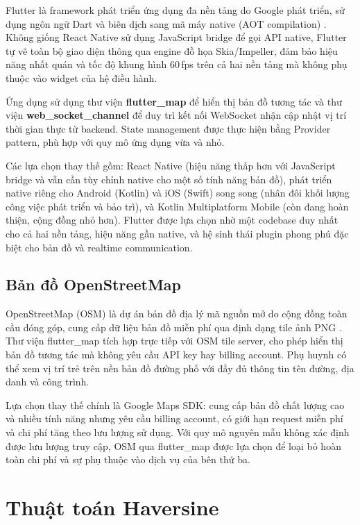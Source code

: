 \documentclass[../DoAn.tex]{subfiles}
\begin{document}
Flutter là framework phát triển ứng dụng đa nền tảng do Google phát triển, sử dụng ngôn ngữ Dart và biên dịch sang mã máy native (AOT compilation) \cite{flutter_docs}. Không giống React Native sử dụng JavaScript bridge để gọi API native, Flutter tự vẽ toàn bộ giao diện thông qua engine đồ họa Skia/Impeller, đảm bảo hiệu năng nhất quán và tốc độ khung hình 60\,fps trên cả hai nền tảng mà không phụ thuộc vào widget của hệ điều hành.

Ứng dụng sử dụng thư viện \textbf{flutter\_map} \cite{flutter_map_pkg} để hiển thị bản đồ tương tác và thư viện \textbf{web\_socket\_channel} để duy trì kết nối WebSocket nhận cập nhật vị trí thời gian thực từ backend. State management được thực hiện bằng Provider pattern, phù hợp với quy mô ứng dụng vừa và nhỏ.

Các lựa chọn thay thế gồm: React Native (hiệu năng thấp hơn với JavaScript bridge và vẫn cần tùy chỉnh native cho một số tính năng bản đồ), phát triển native riêng cho Android (Kotlin) và iOS (Swift) song song (nhân đôi khối lượng công việc phát triển và bảo trì), và Kotlin Multiplatform Mobile (còn đang hoàn thiện, cộng đồng nhỏ hơn). Flutter được lựa chọn nhờ một codebase duy nhất cho cả hai nền tảng, hiệu năng gần native, và hệ sinh thái plugin phong phú đặc biệt cho bản đồ và realtime communication.

\subsection{Bản đồ OpenStreetMap}
\label{subsection:3.4.2}

OpenStreetMap (OSM) là dự án bản đồ địa lý mã nguồn mở do cộng đồng toàn cầu đóng góp, cung cấp dữ liệu bản đồ miễn phí qua định dạng tile ảnh PNG \cite{osm_wiki}. Thư viện flutter\_map tích hợp trực tiếp với OSM tile server, cho phép hiển thị bản đồ tương tác mà không yêu cầu API key hay billing account. Phụ huynh có thể xem vị trí trẻ trên nền bản đồ đường phố với đầy đủ thông tin tên đường, địa danh và công trình.

Lựa chọn thay thế chính là Google Maps SDK: cung cấp bản đồ chất lượng cao và nhiều tính năng nhưng yêu cầu billing account, có giới hạn request miễn phí và chi phí tăng theo lưu lượng sử dụng. Với quy mô nguyên mẫu không xác định được lưu lượng truy cập, OSM qua flutter\_map được lựa chọn để loại bỏ hoàn toàn chi phí và sự phụ thuộc vào dịch vụ của bên thứ ba.

\section{Thuật toán Haversine}
\label{section:3.5}
\end{document}

